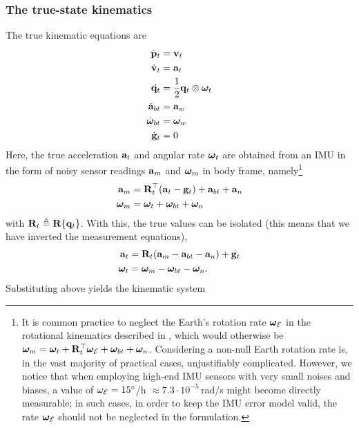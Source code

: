 \subsubsection{The true-state kinematics}

The true kinematic equations are
%
\begin{subequations}
%
\begin{align}
\dot{{\bf p}}_t &= {\bf v}_t \\
\dot{{\bf v}}_t &= {\bf a}_t \\
\dot{{\bf q}_t} &= \frac{1}{2}{\bf q}_t\otimes{\bm \omega}_t \\
\dot{{\bf a}}_{bt} &= {\bf a}_w \\
\dot{{\bm \omega}}_{bt} &= {\bm \omega}_w \\
\dot{{\bf g}}_t &= 0
\end{align}%
\end{subequations}
%
Here, the true acceleration ${\bf a}_t$ and angular rate ${\bm \omega}_t$ are obtained from an IMU in the form of noisy sensor readings  ${\bf a}_m$ and ${\bm \omega}_m$ in body frame, namely\footnote{It is common practice to neglect the Earth's rotation rate ${\bm \omega}_{\mathcal{E}}$ in the rotational kinematics described in , which would otherwise be ${\bm \omega}_m = {\bm \omega}_t + {\bf R}_t^{\top}{\bm \omega}_{\mathcal{E}} + {\bm \omega}_{bt} + {\bm \omega}_n$. 
Considering a non-null Earth rotation rate is, in the vast majority of practical cases, unjustifiably complicated.
However, we notice that when employing high-end IMU sensors with very small noises and biases, a value of $\omega_{\mathcal{E}}=15^\circ$/h $\approx 7.3\cdot10^{-5}\,$rad/s might become directly measurable; in such cases, in order to keep the IMU error model valid, the rate ${\bm \omega}_{\mathcal{E}}$ should not be neglected in the formulation.}
%
%
\begin{align}
{\bf a}_m &= {\bf R}_t^{\top}({\bf a}_t - {\bf g}_t) + {\bf a}_{bt} + {\bf a}_n \\
{\bm \omega}_m &= {\bm \omega}_t + {\bm \omega}_{bt} + {\bm \omega}_n \label{equ:gyroModel}
\end{align}%
%
with ${\bf R}_t\triangleq{\bf R}\{{\bf q}_t\}$. With this, the true values can be isolated (this means that we have inverted the measurement equations),
%
%
\begin{align}
{\bf a}_t &= {\bf R}_t({\bf a}_m - {\bf a}_{bt} - {\bf a}_n) + {\bf g}_t \\
{\bm \omega}_t &= {\bm \omega}_m - {\bm \omega}_{bt} - {\bm \omega}_n.
\end{align}%
%
Substituting above yields the kinematic system
